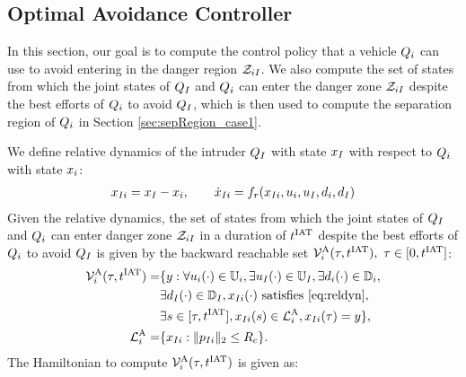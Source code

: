 \subsection{Optimal Avoidance Controller} \label{sec:intruder_avoid}
In this section, our goal is to compute the control policy that a vehicle $Q_i$ can use to avoid entering in the danger region $\mathcal{Z}_{iI}$. We also compute the set of states from which the joint states of $Q_{I}$ and $Q_i$ can enter the danger zone $\mathcal{Z}_{iI}$ despite the best efforts of $Q_i$ to avoid $Q_{I}$, which is then used to compute the separation region of $Q_i$ in Section \ref{sec:sepRegion_case1}. 

We define relative dynamics of the intruder $Q_{I}$ with state $x_I$ with respect to $Q_i$ with state $x_i$:
\begin{equation}
\label{eq:reldyn}
\begin{aligned}
\state_{\intr i} = \state_\intr - \state_i, \qquad \dot \state_{\intr i} = f_r(\state_{\intr i}, \ctrl_i, \ctrl_\intr, \dstb_i, \dstb_\intr)
\end{aligned}
\end{equation}
Given the relative dynamics, the set of states from which the joint states of $Q_{I}$ and $Q_{i}$ can enter danger zone $\mathcal{Z}_{iI}$ in a duration of $t^\text{IAT}$ despite the best efforts of $Q_i$ to avoid $Q_{I}$ is given by the backward reachable set $\mathcal{V}^{\text{A}}_i(\tau, t^\text{IAT}),~ \tau \in [0, t^\text{IAT}]$:
\begin{equation} \label{eqn:avoidBRS}
\begin{aligned}
\brs^{\text{A}}_{i}(\tau, \iat) = & \{y: \forall \ctrl_i(\cdot) \in \cfset_i, \exists \ctrl_\intr(\cdot) \in \cfset_\intr, \exists \dstb_i(\cdot) \in \dfset_i, \\
& \exists \dstb_\intr(\cdot) \in \dfset_\intr, \state_{\intr i}(\cdot) \text{ satisfies \eqref{eq:reldyn}},\\
& \exists s \in [\tau, \iat], \state_{\intr i}(s) \in \targetset^{\text{A}}_{i}, \state_{\intr i}(\tau) = y\},\\
\targetset^{\text{A}}_{i} = & \{\state_{\intr i}: \|\pos_{\intr i}\|_2 \le \rc\}.
\end{aligned}
\end{equation}
The Hamiltonian to compute $\mathcal{V}^{\text{A}}_{i}(\tau, t^\text{IAT})$ is given as:
